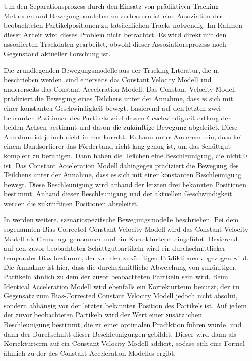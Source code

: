 Um den Separationsprozess durch den Einsatz von prädiktiven Tracking Methoden und Bewegungsmodellen zu verbessern ist eine Assoziation 
der beobachteten Partikelpositionen zu tatsächlichen Tracks notwendig. 
Im Rahmen dieser Arbeit wird dieses Problem nicht betrachtet. 
Es wird direkt mit den assoziierten Trackdaten gearbeitet, 
obwohl dieser Assoziationsprozess noch Gegenstand aktueller Forschung ist.

Die grundlegenden Bewegungsmodelle aus der Tracking-Literatur, die in \cite{Pfaff2018} beschrieben werden,
sind einerseits das Constant Velocity Modell und andererseits das Constant Acceleration Modell.
Das Constant Velocity Modell prädiziert die Bewegung eines Teilchens unter der Annahme, dass es sich mit einer konstanten Geschwindigkeit bewegt.
Basierend auf den letzten zwei bekannten Positionen des Partikels wird dessen Geschwindigkeit entlang der beiden Achsen bestimmt 
und davon die zukünftige Bewegung abgeleitet.
Diese Annahme ist jedoch nicht immer korrekt.
Es kann unter Anderem sein, dass bei einem Bandsortierer das Förderband nicht lang genug ist, um das Schüttgut komplett zu beruhigen.
Dann haben die Teilchen eine Beschleunigung, die nicht 0 ist.
Das Constant Acceleration Modell dahingegen prädiziert die Bewegung des Teilchens unter der Annahme, dass es sich mit einer konstanten Beschleunigung bewegt.
Diese Beschleunigung wird anhand der letzten drei bekannten Positionen bestimmt.
Anhand dieser Beschleunigung und der aktuellen Geschwindigkeit werden die zukünftigen Positionen abgeleitet.

In \cite{Pfaff2018} werden weitere, szenariospezifische Bewegungsmodelle beschrieben.
Bei dem sogenannten Bias-Corrected Constant Velocity Modell wird das Constant Velocity Modell als Grundlage genommen und ein Korrekturterm eingeführt.
Basierend auf den zuvor beobachteten Schüttgutpartikeln wird ein durchschnittlicher temporaler Bias bestimmt, der von den zukünftigen Prädiktionen abgezogen wird.
Die Annahme ist hier, dass die durchschnittliche Abweichung von zukünftigen Partikeln ähnlich zu dem der zuvor beobachteten Partikeln sein wird.
Beim Identical Acceleration Modell wird ebenfalls ein Korrekturterm benutzt, 
der im Gegensatz zum Bias-Corrected Constant Velocity Modell jedoch nicht absolut, sondern abhängig von der letzten bekannten Position des Partikels ist.
Auf jedem der zuvor beobachteten Partikeln wird der Wert einer zusätzlichen Beschleunigung bestimmt, die zu einer optimalen Prädiktion führen würde,
und dann der Durchschnitt dieser Beschleunigungen gebildet.
Dieser wird dann als Korrekturterm auf ein Constant Velocity Modell addiert, sodass sich eine Formel ähnlich zu der des Constant Acceleration Modelles ergibt.

